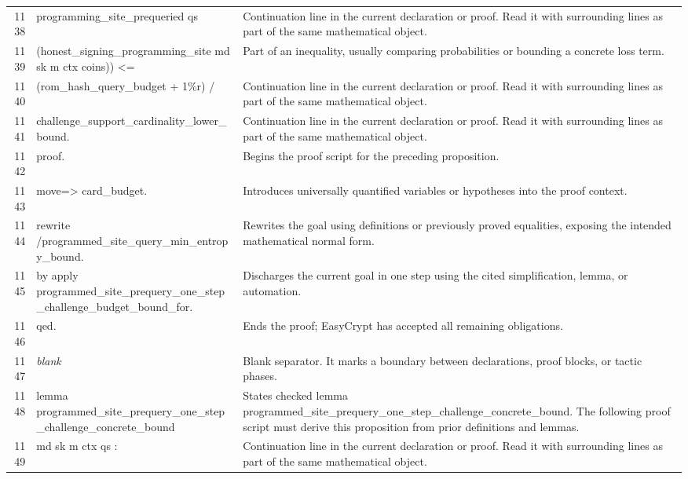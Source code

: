 \documentclass[10pt]{article}
\begin{document}
\begin{longtable}{r L{0.53\textwidth} L{0.37\textwidth}}
1138 & {\ttfamily\scriptsize       programming\_site\_prequeried qs} & Continuation line in the current declaration or proof.  Read it with surrounding lines as part of the same mathematical object. \\
1139 & {\ttfamily\scriptsize         (honest\_signing\_programming\_site md sk m ctx coins)) <=} & Part of an inequality, usually comparing probabilities or bounding a concrete loss term. \\
1140 & {\ttfamily\scriptsize   (rom\_hash\_query\_budget + 1\%r) /} & Continuation line in the current declaration or proof.  Read it with surrounding lines as part of the same mathematical object. \\
1141 & {\ttfamily\scriptsize     challenge\_support\_cardinality\_lower\_bound.} & Continuation line in the current declaration or proof.  Read it with surrounding lines as part of the same mathematical object. \\
1142 & {\ttfamily\scriptsize proof.} & Begins the proof script for the preceding proposition. \\
1143 & {\ttfamily\scriptsize move=> card\_budget.} & Introduces universally quantified variables or hypotheses into the proof context. \\
1144 & {\ttfamily\scriptsize rewrite /programmed\_site\_query\_min\_entropy\_bound.} & Rewrites the goal using definitions or previously proved equalities, exposing the intended mathematical normal form. \\
1145 & {\ttfamily\scriptsize by apply programmed\_site\_prequery\_one\_step\_challenge\_budget\_bound\_for.} & Discharges the current goal in one step using the cited simplification, lemma, or automation. \\
1146 & {\ttfamily\scriptsize qed.} & Ends the proof; EasyCrypt has accepted all remaining obligations. \\
1147 & {\ttfamily\scriptsize \emph{blank}} & Blank separator.  It marks a boundary between declarations, proof blocks, or tactic phases. \\
1148 & {\ttfamily\scriptsize lemma programmed\_site\_prequery\_one\_step\_challenge\_concrete\_bound} & States checked lemma programmed\_site\_prequery\_one\_step\_challenge\_concrete\_bound.  The following proof script must derive this proposition from prior definitions and lemmas. \\
1149 & {\ttfamily\scriptsize   md sk m ctx qs :} & Continuation line in the current declaration or proof.  Read it with surrounding lines as part of the same mathematical object. \\

\end{longtable}
\end{document}
